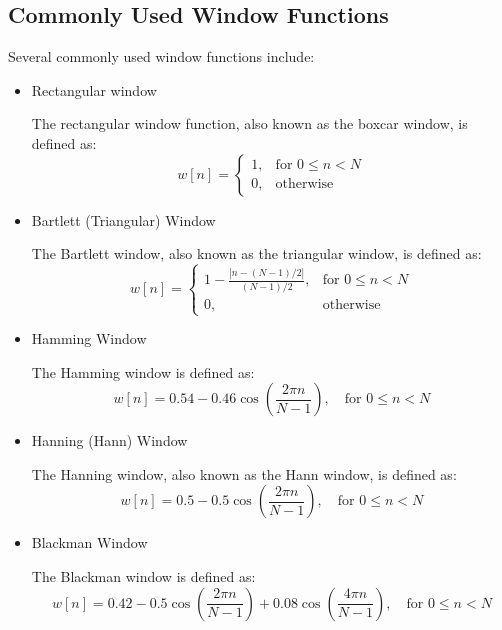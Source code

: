 \documentclass{article}
\begin{document}
\subsection{Commonly Used Window Functions}

Several commonly used window functions include:
\begin{itemize}
 \item Rectangular window

The rectangular window function, also known as the boxcar window, is defined as:
\begin{equation}
w[n] = \begin{cases}
1, & \text{for } 0 \leq n < N \\
0, & \text{otherwise}
\end{cases}
\end{equation}

 \item Bartlett (Triangular) Window
 
The Bartlett window, also known as the triangular window, is defined as:
\begin{equation}
w[n] = \begin{cases}
1 - \frac{|n - (N - 1)/2|}{(N - 1)/2}, & \text{for } 0 \leq n < N \\
0, & \text{otherwise}
\end{cases}
\end{equation}

 \item Hamming Window
 
The Hamming window is defined as:
\begin{equation}
w[n] = 0.54 - 0.46 \cos\left(\frac{2\pi n}{N - 1}\right), \quad \text{for } 0 \leq n < N
\end{equation}

 \item Hanning (Hann) Window
 
The Hanning window, also known as the Hann window, is defined as:
\begin{equation}
w[n] = 0.5 - 0.5 \cos\left(\frac{2\pi n}{N - 1}\right), \quad \text{for } 0 \leq n < N
\end{equation}

 \item Blackman Window
 
The Blackman window is defined as:
\begin{equation}
w[n] = 0.42 - 0.5 \cos\left(\frac{2\pi n}{N - 1}\right) + 0.08 \cos\left(\frac{4\pi n}{N - 1}\right), \quad \text{for } 0 \leq n < N
\end{equation}
\end{itemize}
\end{document}
